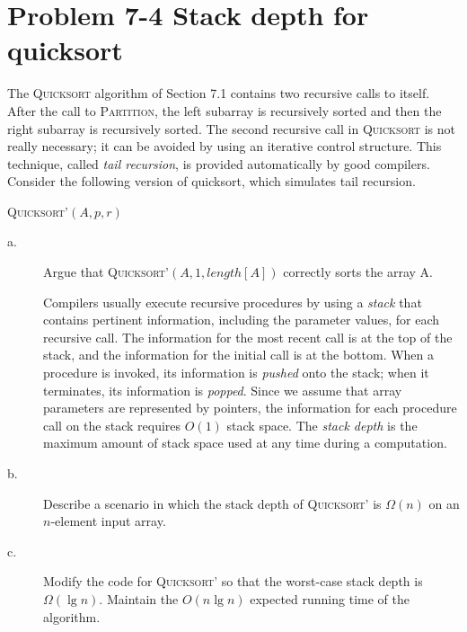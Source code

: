 \documentclass[a4paper,10pt]{article}
\newcommand{\problem}[1]{\section*{Problem #1}}
\begin{document}
\problem{7-4 Stack depth for quicksort}
The \textsc{Quicksort} algorithm of Section 7.1 contains two recursive calls to itself.
After the call to \textsc{Partition}, the left subarray is recursively sorted and then the right subarray
is recursively sorted. The second recursive call in \textsc{Quicksort} is not really necessary; it can be
avoided by using an iterative control structure. This technique, called \emph{tail recursion},
is provided automatically by good compilers. Consider the following version of quicksort, which simulates tail recursion.

\begin{algorithm}[H]
  \caption{\textsc{Quicksort'$(A, p, r)$}}
\end{algorithm}

\begin{description}
\item[a. \hspace{9pt}] Argue that \textsc{Quicksort'}$(A, 1, length[A])$ correctly sorts the array A.

Compilers usually execute recursive procedures by using a \emph{stack} that contains pertinent information, including
the parameter values, for each recursive call. The information for the most recent call is at the top of the stack,
and the information for the initial call is at the bottom. When a procedure is invoked, its information is \emph{pushed}
 onto the stack; when it terminates, its information is \emph{popped}. Since we assume that array parameters are
 represented by pointers, the information for each procedure call on the stack requires $O(1)$ stack space.
 The \emph{stack depth} is the maximum amount of stack space used at any time during a computation.

\item[b. \hspace{9pt}] Describe a scenario in which the stack depth of \textsc{Quicksort'} is $\Omega(n)$ on an 
$n$-element input array.

\item[c. \hspace{9pt}] Modify the code for \textsc{Quicksort'} so that the worst-case stack depth is $\Omega(\lg n)$.
Maintain the $O(n\lg n)$ expected running time of the algorithm.

\end{description}
\end{document}

